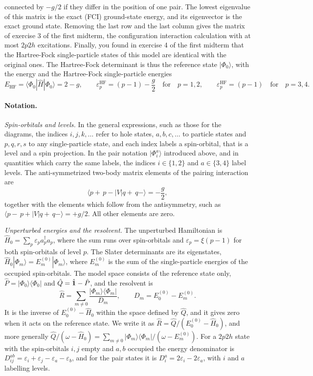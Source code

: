 \documentclass[prc]{revtex4}
\begin{document}
connected by $-g/2$ if they differ in the position of one pair. The
lowest eigenvalue of this matrix is the exact (FCI) ground-state
energy, and its eigenvector is the exact ground state. Removing the
last row and the last column gives the matrix of exercise 3 of the
first midterm, the configuration interaction calculation with at most
$2p2h$ excitations. Finally, you found in exercise 4 of the first
midterm that the Hartree-Fock single-particle states of this model are
identical with the original ones. The Hartree-Fock determinant is thus
the reference state $|\Phi_0\rangle$, with the energy and the
Hartree-Fock single-particle energies
\begin{equation}
E_{\mathrm{HF}}=\langle\Phi_0|\hat{H}|\Phi_0\rangle=2-g,\qquad
\varepsilon^{\mathrm{HF}}_{p}=(p-1)-\frac{g}{2}\quad\text{for}\quad p=1,2,\qquad
\varepsilon^{\mathrm{HF}}_{p}=(p-1)\quad\text{for}\quad p=3,4 .
\label{eq:hfenergies}
\end{equation}

\paragraph*{Notation.}
\emph{Spin-orbitals and levels.} In the general expressions, such as
those for the diagrams, the indices $i,j,k,\dots$ refer to hole
states, $a,b,c,\dots$ to particle states and $p,q,r,s$ to any
single-particle state, and each index labels a spin-orbital, that is
a level and a spin projection. In the pair notation
$|\Phi_i^a\rangle$ introduced above, and in quantities which carry the
same labels, the indices $i\in\{1,2\}$ and $a\in\{3,4\}$ label
levels. The anti-symmetrized two-body matrix elements of the pairing
interaction are
\[
\langle p{+}\,p{-}|V|q{+}\,q{-}\rangle=-\frac{g}{2},
\]
together with the elements which follow from the antisymmetry, such as
$\langle p{-}\,p{+}|V|q{+}\,q{-}\rangle=+g/2$. All other elements are
zero.

\emph{Unperturbed energies and the resolvent.} The unperturbed
Hamiltonian is $\hat{H}_0=\sum_p\varepsilon_pa^\dagger_pa_p$, where
the sum runs over spin-orbitals and $\varepsilon_p=\xi(p-1)$ for both
spin-orbitals of level $p$. The Slater determinants are its
eigenstates,
$\hat{H}_0|\Phi_m\rangle=E^{(0)}_m|\Phi_m\rangle$, where $E^{(0)}_m$ is
the sum of the single-particle energies of the occupied
spin-orbitals. The model space consists of the reference state only,
$\hat{P}=|\Phi_0\rangle\langle\Phi_0|$ and
$\hat{Q}=\hat{\bf 1}-\hat{P}$, and the resolvent is
\[
\hat{R}=\sum_{m\neq 0}\frac{|\Phi_m\rangle\langle\Phi_m|}{D_m},
\qquad D_m=E^{(0)}_0-E^{(0)}_m .
\]
It is the inverse of $E^{(0)}_0-\hat{H}_0$ within the space defined by
$\hat{Q}$, and it gives zero when it acts on the reference state. We
write it as $\hat{R}=\hat{Q}/(E^{(0)}_0-\hat{H}_0)$, and more generally
$\hat{Q}/(\omega-\hat{H}_0)=\sum_{m\neq
0}|\Phi_m\rangle\langle\Phi_m|/(\omega-E^{(0)}_m)$. For a $2p2h$ state
with the spin-orbitals $i,j$ empty and $a,b$ occupied the energy
denominator is
$D_{ij}^{ab}=\varepsilon_i+\varepsilon_j-\varepsilon_a-\varepsilon_b$,
and for the pair states it is
$D_i^a=2\varepsilon_i-2\varepsilon_a$, with $i$ and $a$ labelling
levels.
\end{document}
